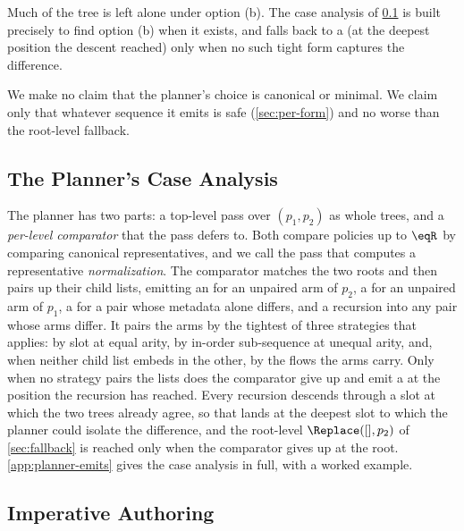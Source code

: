 Much of the tree is left alone under option (b).
The case analysis of \cref{sec:planner-emits} is built precisely to find option (b) when it exists, and falls back to a \Replace{} (at the deepest position the descent reached) only when no such tight form captures the difference.

We make no claim that the planner's choice is canonical or minimal.
We claim only that whatever sequence it emits is safe (\cref{sec:per-form}) and no worse than the root-level fallback.

\subsection{The Planner's Case Analysis}\label{sec:planner-emits}

The planner has two parts: a top-level pass over \((p_1, p_2)\) as whole trees, and a \emph{per-level comparator} that the pass defers to.
Both compare policies up to \(\eqR\) by comparing canonical representatives, and we call the pass that computes a representative \emph{normalization}.
The comparator matches the two roots and then pairs up their child lists, emitting an \Add{} for an unpaired arm of \(p_2\), a \Retire{} for an unpaired arm of \(p_1\), a \ChangeMeta{} for a pair whose metadata alone differs, and a recursion into any pair whose arms differ.
It pairs the arms by the tightest of three strategies that applies: by slot at equal arity, by in-order sub-sequence at unequal arity, and, when neither child list embeds in the other, by the flows the arms carry.
Only when no strategy pairs the lists does the comparator give up and emit a \Replace{} at the position the recursion has reached.
Every recursion descends through a slot at which the two trees already agree, so that \Replace{} lands at the deepest slot to which the planner could isolate the difference, and the root-level \(\Replace([], p_2)\) of \cref{sec:fallback} is reached only when the comparator gives up at the root.
\cref{app:planner-emits} gives the case analysis in full, with a worked example.

\subsection{Imperative Authoring}\label{sec:imperative}

